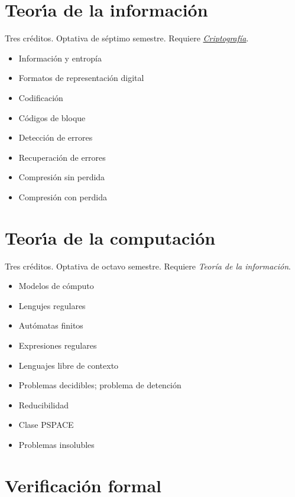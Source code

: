 \documentclass{article}
\begin{document}
\begin{multicols}{4}
\newpage

\hypertarget{tdi}{\section*{Teor\'{\i}a de la informaci\'{o}n}}

Tres cr\'{e}ditos. Optativa de s\'{e}ptimo semestre. Requiere
\hyperlink{cr}{\em Criptograf\'{i}a}.

\begin{itemize}
\item{Informaci\'{o}n y entrop\'{i}a}
\item{Formatos de representaci\'{o}n digital}
\item{Codificaci\'{o}n}
\item{C\'{o}digos de bloque}
\item{Detecci\'{o}n de errores}
\item{Recuperaci\'{o}n de errores}
\item{Compresi\'{o}n sin perdida}
\item{Compresi\'{o}n con perdida}
\end{itemize}

\vfill\null \columnbreak

\hypertarget{tdc}{\section*{Teor\'{\i}a de la computaci\'{o}n}}

Tres cr\'{e}ditos. Optativa de octavo semestre. Requiere
{\em Teor\'{i}a de la informaci\'{o}n}.

\begin{itemize}
\item{Modelos de c\'{o}mputo}
\item{Lengujes regulares}
\item{Aut\'{o}matas finitos}
\item{Expresiones regulares}
\item{Lenguajes libre de contexto}
\item{Problemas decidibles; problema de detenci\'{o}n}
\item{Reducibilidad}
\item{Clase PSPACE}
\item{Problemas insolubles}
\end{itemize}

\vfill\null \columnbreak

\hypertarget{vf}{\section*{Verificaci\'{o}n formal}} 


\end{multicols}
\end{document}

